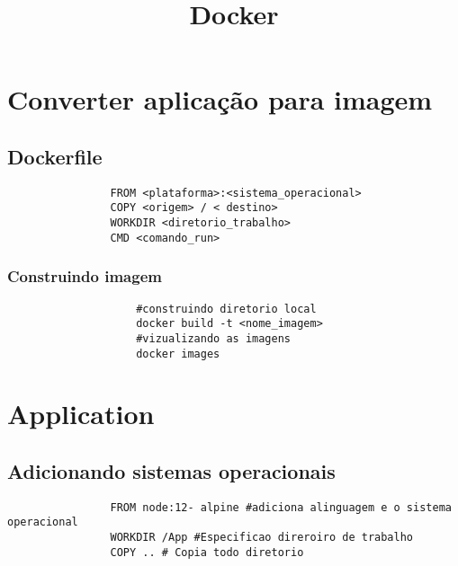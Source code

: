 \documentclass{article}
\date{} %
\title{Docker}
\begin{document}
    \maketitle
    \section{Converter aplicação para imagem}
        \subsection{Dockerfile}
            \begin{lstlisting}
                FROM <plataforma>:<sistema_operacional>
                COPY <origem> / < destino>
                WORKDIR <diretorio_trabalho>
                CMD <comando_run>
            \end{lstlisting}
            \subsubsection{Construindo imagem}
                \begin{lstlisting}
                    #construindo diretorio local
                    docker build -t <nome_imagem>
                    #vizualizando as imagens
                    docker images 
                \end{lstlisting}

    \section{Application}
        \subsection{Adicionando sistemas operacionais}
            \begin{lstlisting}
                FROM node:12- alpine #adiciona alinguagem e o sistema operacional 
                WORKDIR /App #Especificao direroiro de trabalho
                COPY .. # Copia todo diretorio
            \end{lstlisting}
\end{document}
